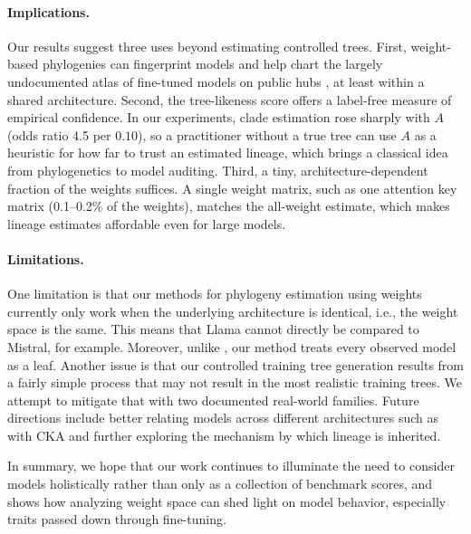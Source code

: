 \documentclass{article}
\theoremstyle{definition}
\theoremstyle{plain}
\begin{document}
\paragraph{Implications.} Our results suggest three uses beyond estimating controlled trees. First, weight-based phylogenies can fingerprint models and help chart the largely undocumented atlas of fine-tuned models on public hubs \citep{horwitz2025chartatlasworldsmodels}, at least within a shared architecture. Second, the tree-likeness score offers a label-free measure of empirical confidence. In our experiments, clade estimation rose sharply with $A$ (odds ratio 4.5 per $0.10$), so a practitioner without a true tree can use $A$ as a heuristic for how far to trust an estimated lineage, which brings a classical idea from phylogenetics to model auditing. Third, a tiny, architecture-dependent fraction of the weights suffices. A single weight matrix, such as one attention key matrix (0.1--0.2\% of the weights), matches the all-weight estimate, which makes lineage estimates affordable even for large models.

\paragraph{Limitations.} One limitation is that our methods for phylogeny estimation using weights currently only work when the underlying architecture is identical, i.e., the weight space is the same.  This means that Llama cannot directly be compared to Mistral, for example. Moreover, unlike \citet{horwitz2025mother}, our method treats every observed model as a leaf. Another issue is that our controlled training tree generation results from a fairly simple process that may not result in the most realistic training trees.  We attempt to mitigate that with two documented real-world families. Future directions include better relating models across different architectures such as with CKA and further exploring the mechanism by which lineage is inherited. 

In summary, we hope that our work continues to illuminate the need to consider models holistically rather than only as a collection of benchmark scores, and shows how analyzing weight space can shed light on model behavior, especially traits passed down through fine-tuning.


\end{document}
